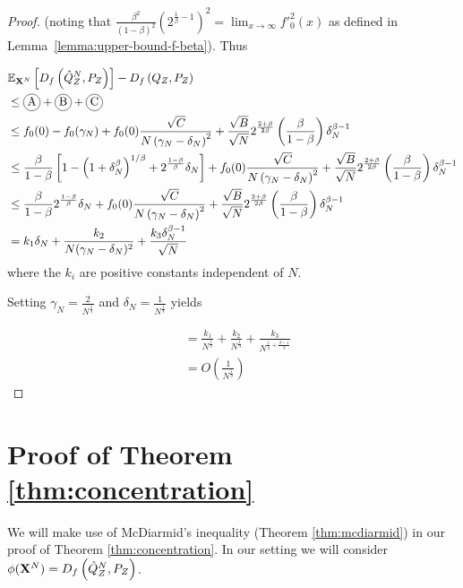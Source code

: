\begin{proof}
(noting that $\frac{\beta^2}{(1-\beta)^2}\left(2^{\frac{1}{\beta} - 1}\right)^2 = \lim_{x\to\infty} f'^2_0(x)$ as defined in Lemma~\ref{lemma:upper-bound-f-beta}). Thus

\begin{align*}
    &\E_{\XN} \left[ D_f\left( \hat{Q}_Z^N , P_Z\right)\right] - D_f\left( Q_{Z} , P_Z\right)\\
    &\leq \encircle{A} + \encircle{B} + \encircle{C} \\
    &\leq f_0(0) - f_0(\gamma_N) + f_0(0) \frac{\sqrt{C}}{N \left( \gamma_N - \delta_N \right)^2} + \frac{\sqrt{B}}{\sqrt{N}}2^{\frac{2+\beta}{2\beta}}\left(\frac{\beta}{1-\beta}\right) \delta_N^{\beta - 1}\\
    &\leq \frac{\beta}{1-\beta}\left[1 - \left(1+\delta_N^\beta\right)^{1/\beta} + 2^{\frac{1-\beta}{\beta}}\delta_N\right] + f_0(0) \frac{\sqrt{C}}{N \left( \gamma_N - \delta_N \right)^2} + \frac{\sqrt{B}}{\sqrt{N}}2^{\frac{2+\beta}{2\beta}}\left(\frac{\beta}{1-\beta}\right) \delta_N^{\beta - 1}\\
    &\leq \frac{\beta}{1-\beta} 2^{\frac{1-\beta}{\beta}}\delta_N + f_0(0) \frac{\sqrt{C}}{N \left( \gamma_N - \delta_N \right)^2}  + \frac{\sqrt{B}}{\sqrt{N}}2^{\frac{2+\beta}{2\beta}}\left(\frac{\beta}{1-\beta}\right) \delta_N^{\beta - 1}\\
    &= k_1 \delta_N + \frac{k_2}{N(\gamma_N - \delta_N)^2} + \frac{k_3\delta_N^{\beta-1}}{\sqrt{N}}
\end{align*}
where the $k_i$ are positive constants independent of $N$.

Setting $\gamma_N = \frac{2}{N^\frac{1}{3}}$ and $\delta_N = \frac{1}{N^\frac{1}{3}}$ yields

\begin{align*}
    &= \frac{k_1}{N^{\frac{1}{3}}}
    + \frac{k_2}{N^{\frac{1}{3}}} 
    + \frac{k_3}{N^{\frac{1}{2}+\frac{\beta-1}{3}}} \\
    &= O\left(\frac{1}{N^\frac{1}{3}}\right)
\end{align*}

\end{proof}

\section{Proof of Theorem \ref{thm:concentration}}\label{proof:thm3}

We will make use of McDiarmid's inequality (Theorem \ref{thm:mcdiarmid}) in our proof of Theorem \ref{thm:concentration}.
In our setting we will consider $\phi(\mathbf{X}^N) = D_f\left( \hat{Q}_Z^N , P_Z\right)$.


